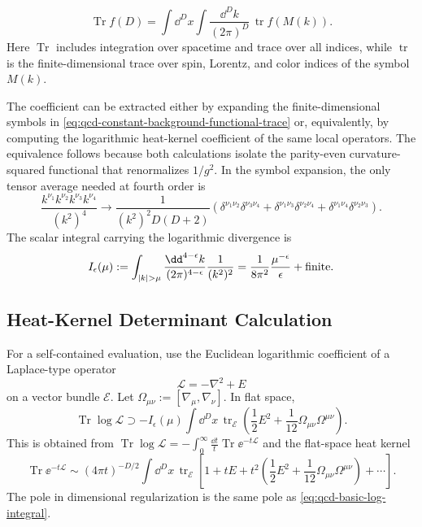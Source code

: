 \begin{equation}
  \operatorname{Tr} f(D)
  =
  \int\dd^Dx
  \int\frac{\dd^Dk}{(2\pi)^D}\,
  \operatorname{tr} f(M(k)).
  \label{eq:qcd-constant-background-functional-trace}
\end{equation}
Here \(\operatorname{Tr}\) includes integration over spacetime and trace over
all indices, while \(\operatorname{tr}\) is the finite-dimensional trace over
spin, Lorentz, and color indices of the symbol \(M(k)\).

The coefficient can be extracted either by expanding the finite-dimensional
symbols in \eqref{eq:qcd-constant-background-functional-trace} or,
equivalently, by computing the logarithmic heat-kernel coefficient of the
same local operators.  The equivalence follows because both calculations
isolate the parity-even curvature-squared functional that renormalizes
\(1/g^2\).  In the symbol expansion, the only tensor average needed at fourth
order is
\begin{equation}
  \frac{k^{\nu_1}k^{\nu_2}k^{\nu_3}k^{\nu_4}}{(k^2)^4}
  \longrightarrow
  \frac1{(k^2)^2D(D+2)}
  \left(
    \delta^{\nu_1\nu_2}\delta^{\nu_3\nu_4}
    +\delta^{\nu_1\nu_3}\delta^{\nu_2\nu_4}
    +\delta^{\nu_1\nu_4}\delta^{\nu_2\nu_3}
  \right).
  \label{eq:qcd-k-four-rotational-average}
\end{equation}
The scalar integral carrying the logarithmic divergence is
\begin{equation}
  I_\epsilon(\mu)
  :=
  \int_{|k|>\mu}
  \frac{\dd^{4-\epsilon}k}{(2\pi)^{4-\epsilon}}\frac1{(k^2)^2}
  =
  \frac1{8\pi^2}\frac{\mu^{-\epsilon}}{\epsilon}
  +\hbox{finite}.
  \label{eq:qcd-basic-log-integral}
\end{equation}

\subsection{Heat-Kernel Determinant Calculation}
\label{subsec:qcd-heat-kernel-determinant-calculation}

For a self-contained evaluation, use the Euclidean logarithmic coefficient of
a Laplace-type operator
\[
  \mathcal L=-\nabla^2+E
\]
on a vector bundle \(\mathcal E\).  Let
\(\Omega_{\mu\nu}:=[\nabla_\mu,\nabla_\nu]\).  In flat space,
\begin{equation}
  \operatorname{Tr}\log\mathcal L
  \supset
  -I_\epsilon(\mu)
  \int\dd^Dx\,
  \operatorname{tr}_{\mathcal E}
  \left(
    \frac12 E^2+\frac1{12}\Omega_{\mu\nu}\Omega^{\mu\nu}
  \right).
  \label{eq:qcd-laplace-heat-coefficient}
\end{equation}
This is obtained from
\(\operatorname{Tr}\log\mathcal L=-\int_0^\infty
\frac{\dd t}{t}\operatorname{Tr}\ee^{-t\mathcal L}\) and the flat-space heat
kernel
\[
  \operatorname{Tr}\ee^{-t\mathcal L}
  \sim
  (4\pi t)^{-D/2}
  \int\dd^Dx\,\operatorname{tr}_{\mathcal E}
  \left[
    1+tE+t^2
    \left(
      \frac12 E^2+\frac1{12}\Omega_{\mu\nu}\Omega^{\mu\nu}
    \right)+\cdots
  \right].
\]
The pole in dimensional regularization is the same pole as
\eqref{eq:qcd-basic-log-integral}.

